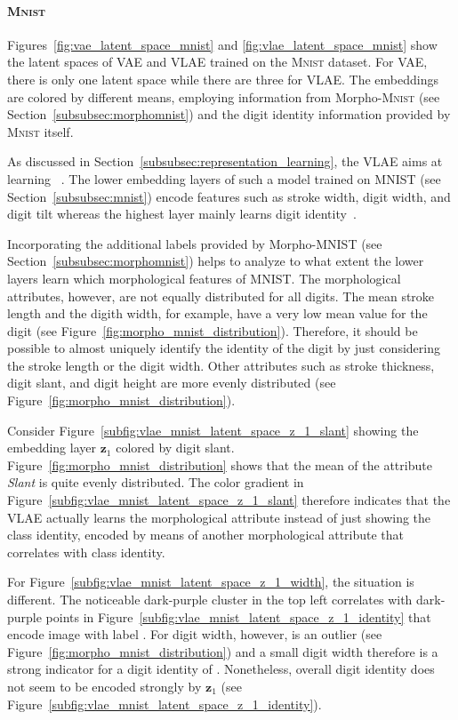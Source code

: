 \paragraph{\textsc{Mnist}}

Figures~\ref{fig:vae_latent_space_mnist} and \ref{fig:vlae_latent_space_mnist} show the latent spaces of \ac{VAE} and \ac{VLAE} trained on the \textsc{Mnist} dataset.
For \ac{VAE}, there is only one latent space while there are three for \ac{VLAE}.
The embeddings are colored by different means, employing information from Morpho-\textsc{Mnist} (see Section~\ref{subsubsec:morphomnist}) and the digit identity information provided by \textsc{Mnist} itself.

As discussed in Section~\ref{subsubsec:representation_learning}, the \acl{VLAE} aims at learning ~\citep{zhao2017learning}.
The lower embedding layers of such a model trained on MNIST (see Section~\ref{subsubsec:mnist}) encode features such as stroke width, digit width, and digit tilt whereas the highest layer mainly learns digit identity~\citep{zhao2017learning}.

Incorporating the additional labels provided by Morpho-\textsc{MNIST} (see Section~\ref{subsubsec:morphomnist}) helps to analyze to what extent the lower layers learn which morphological features of \textsc{MNIST}.
The morphological attributes, however, are not equally distributed for all digits.
The mean stroke length and the digith width, for example, have a very low mean value for the digit  (see Figure~\ref{fig:morpho_mnist_distribution}).
Therefore, it should be possible to almost uniquely identify the identity of the digit  by just considering the stroke length or the digit width.
Other attributes such as stroke thickness, digit slant, and digit height are more evenly distributed (see Figure~\ref{fig:morpho_mnist_distribution}).

Consider Figure~\ref{subfig:vlae_mnist_latent_space_z_1_slant} showing the embedding layer $\bm{z}_1$ colored by digit slant.
Figure~\ref{fig:morpho_mnist_distribution} shows that the mean of the attribute \textit{Slant} is quite evenly distributed.
The color gradient in Figure~\ref{subfig:vlae_mnist_latent_space_z_1_slant} therefore indicates that the VLAE actually learns the morphological attribute instead of just showing the class identity, encoded by means of another morphological attribute that correlates with class identity.

For Figure~\ref{subfig:vlae_mnist_latent_space_z_1_width}, the situation is different.
The noticeable dark-purple cluster in the top left correlates with dark-purple points in Figure~\ref{subfig:vlae_mnist_latent_space_z_1_identity} that encode image with label .
For digit width, however,  is an outlier (see Figure~\ref{fig:morpho_mnist_distribution}) and a small digit width therefore is a strong indicator for a digit identity of .
Nonetheless, overall digit identity does not seem to be encoded strongly by $\bm{z}_1$ (see Figure~\ref{subfig:vlae_mnist_latent_space_z_1_identity}).


